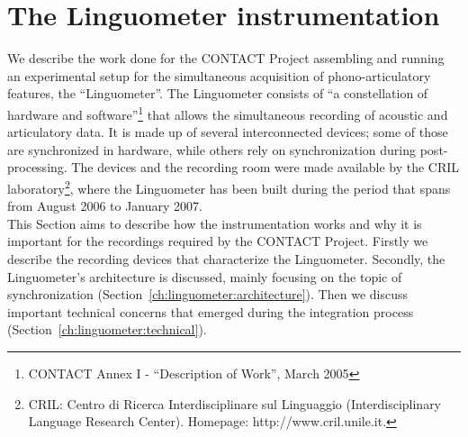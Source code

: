 


\section{The Linguometer instrumentation}
\label{ch:linguometer:instrumentation}

We describe the work done for the CONTACT
Project assembling and running an experimental setup for the simultaneous 
acquisition of phono-articulatory features, the ``Linguometer''.
%
The Linguometer consists of ``a constellation of hardware and
software''\footnote{CONTACT Annex I - ``Description of Work'',
March 2005} that allows the simultaneous recording of acoustic and articulatory
data.
It is made up of several interconnected devices; some of those are 
synchronized in hardware, while others rely on synchronization
during post-processing.
%
The devices and the recording room were made available by the CRIL 
laboratory\footnote{CRIL: Centro di Ricerca Interdisciplinare sul Linguaggio 
(Interdisciplinary Language Research Center).
Homepage: http://www.cril.unile.it.},
where the Linguometer has been built during the period that spans
from August 2006 to January 2007.\\
This Section aims to describe how the instrumentation works and why it is
important for the recordings required by the CONTACT Project.
Firstly we describe the recording devices that characterize the
Linguometer.
Secondly, the Linguometer's architecture is discussed, mainly focusing on the
topic of synchronization (Section~\ref{ch:linguometer:architecture}).
Then we discuss important technical concerns that emerged during
the integration process (Section~\ref{ch:linguometer:technical}).
